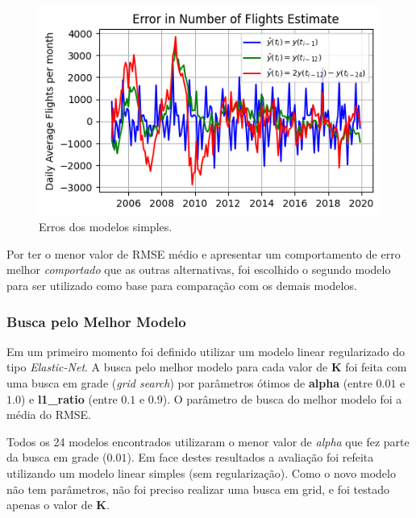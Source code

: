 \documentclass[final,5p]{elsarticle}
\numberwithin{equation}{section}
\begin{document}
        \begin{figure}[hbt!]
            \includegraphics[width=0.95\columnwidth]{B1_NaiveErrors.png}
            \caption{Erros dos modelos simples.}
            \label{fig:naive_erros}
        \end{figure}

    Por ter o menor valor de RMSE médio e apresentar um comportamento de erro melhor \emph{comportado} que as outras alternativas, foi escolhido o segundo modelo para ser utilizado como base para comparação com os demais modelos.

    \subsubsection{Busca pelo Melhor Modelo}

    Em um primeiro momento foi definido utilizar um modelo linear regularizado do tipo \emph{Elastic-Net}. A busca pelo melhor modelo para cada valor de \textbf{K} foi feita com uma busca em grade (\emph{grid search}) por parâmetros ótimos de \textbf{alpha} (entre $0.01$ e $1.0$) e \textbf{l1\_ratio} (entre $0.1$ e $0.9$). O parâmetro de busca do melhor modelo foi a média do RMSE.

    Todos os 24 modelos encontrados utilizaram o menor valor de \emph{alpha} que fez parte da busca em grade ($0.01$). Em face destes resultados a avaliação foi refeita utilizando um modelo linear simples (sem regularização). Como o novo modelo não tem parâmetros, não foi preciso realizar uma busca em grid, e foi testado apenas o valor de \textbf{K}.
\end{document}
